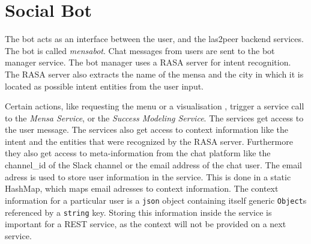 \section{Social Bot}

The bot acts as an interface between the user, and the las2peer backend services. The bot is called \emph{mensabot}.
Chat messages from users are sent to the bot manager service. 
The bot manager uses a RASA server for intent recognition. 
The RASA server also extracts the name of the mensa and the city in which it is located as possible intent entities from the user input.

Certain actions, like requesting the menu or a visualisation , trigger a service call to the \emph{Mensa Service}, or the \emph{Success Modeling Service}.
The services get access to the user message.  
The services also get access to context information like the intent and the entities that were recognized by the RASA server.
Furthermore they also get access to meta-information from the chat platform like the channel\_id of the Slack channel or the email address of the chat user. 
The email adress is used to store user information in the service. This is done in a static HashMap, which maps email adresses to context information. The context information for a particular user is a \texttt{json} object containing itself generic \texttt{Object}s referenced by a \texttt{string} key. 
Storing this information inside the service is important for a REST service, as the context will not be provided on a next service.

